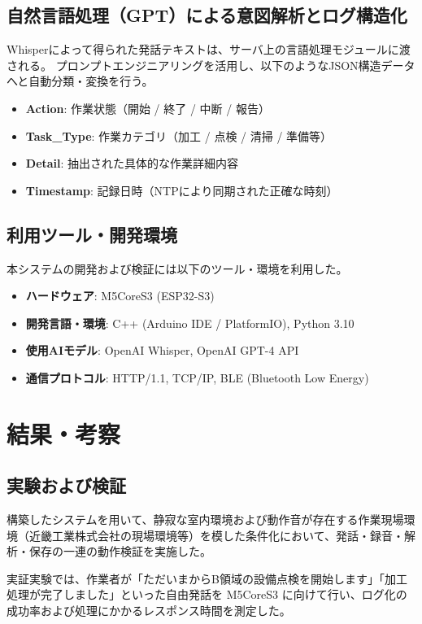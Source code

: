 \documentclass[a4paper,12pt,ja=standard,lualatex]{bxjsarticle}
\begin{document}
\subsection{自然言語処理（GPT）による意図解析とログ構造化}
Whisperによって得られた発話テキストは、サーバ上の言語処理モジュールに渡される。
プロンプトエンジニアリングを活用し、以下のようなJSON構造データへと自動分類・変換を行う。

\begin{itemize}
    \item \textbf{Action}: 作業状態（開始 / 終了 / 中断 / 報告）
    \item \textbf{Task\_Type}: 作業カテゴリ（加工 / 点検 / 清掃 / 準備等）
    \item \textbf{Detail}: 抽出された具体的な作業詳細内容
    \item \textbf{Timestamp}: 記録日時（NTPにより同期された正確な時刻）
\end{itemize}

\subsection{利用ツール・開発環境}
本システムの開発および検証には以下のツール・環境を利用した。
\begin{itemize}
    \item \textbf{ハードウェア}: M5CoreS3 (ESP32-S3)
    \item \textbf{開発言語・環境}: C++ (Arduino IDE / PlatformIO), Python 3.10
    \item \textbf{使用AIモデル}: OpenAI Whisper, OpenAI GPT-4 API
    \item \textbf{通信プロトコル}: HTTP/1.1, TCP/IP, BLE (Bluetooth Low Energy)
\end{itemize}

\newpage

\section{結果・考察}\label{sec4}

\subsection{実験および検証}
構築したシステムを用いて、静寂な室内環境および動作音が存在する作業現場環境（近畿工業株式会社の現場環境等）を模した条件化において、発話・録音・解析・保存の一連の動作検証を実施した。

実証実験では、作業者が「ただいまからB領域の設備点検を開始します」「加工処理が完了しました」といった自由発話を M5CoreS3 に向けて行い、ログ化の成功率および処理にかかるレスポンス時間を測定した。
\end{document}

